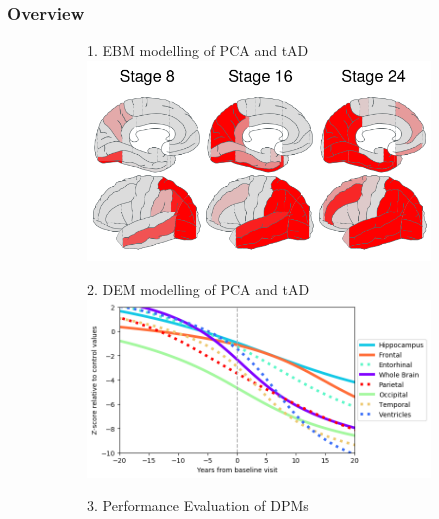 \documentclass[10pt,xcolor=table]{beamer}
\begin{document}
\begin{frame}
\frametitle{Overview}

\vspace{-1em}
\begin{figure}
\centering
\begin{subfigure}{0.47\textwidth}
\centering
{
1. EBM modelling of PCA and tAD\\
\includegraphics[scale=0.15]{ebm_thumb.png}
}
\end{subfigure}
\begin{subfigure}{0.47\textwidth}
\centering

2. DEM  modelling of PCA and tAD\\
\includegraphics[scale=0.15]{../images/dem/mriSmallSebPaper_DEMStdPCA_trajAlign.png}

\end{subfigure}

\begin{subfigure}{0.47\textwidth}
\centering
{
3. Performance Evaluation of DPMs\\
\vspace{1em}

}
\end{subfigure}
\end{figure}
\end{frame}
\end{document}
